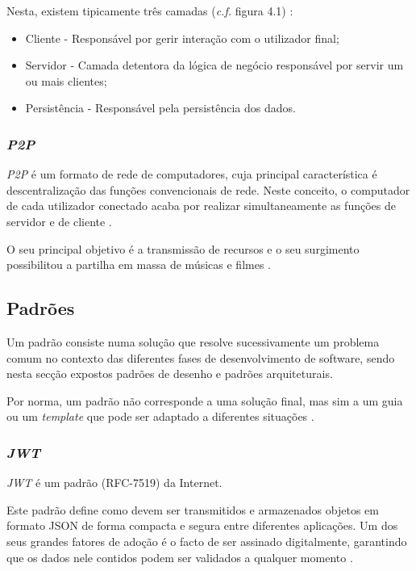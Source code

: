Nesta, existem tipicamente três camadas (\emph{c.f.} figura 4.1) \cite{designing_software_architectures}:

\begin{itemize}
    \item Cliente - Responsável por gerir interação com o utilizador final;
    \item Servidor - Camada detentora da lógica de negócio responsável por servir um ou mais clientes;
    \item Persistência - Responsável pela persistência dos dados.
\end{itemize}

\subsubsection{\emph{\acrshort{P2P}} \label{subsection:p2p}}
\emph{\acrshort{P2P}} é um formato de rede de computadores, cuja principal característica é descentralização das funções convencionais de rede. Neste conceito, o computador de cada utilizador conectado acaba por realizar simultaneamente as funções de servidor e de cliente \cite{what_are_P2P_networks}.

O seu principal objetivo é a transmissão de recursos e o seu surgimento possibilitou a partilha em massa de músicas e filmes \cite{what_are_P2P_networks}.

\subsection{Padrões}
Um padrão consiste numa solução que resolve sucessivamente um problema comum no contexto das diferentes fases de desenvolvimento de software, sendo nesta secção expostos padrões de desenho e padrões arquiteturais. 

Por norma, um padrão não corresponde a uma solução final, mas sim a um guia ou um \emph{template} que pode ser adaptado a diferentes situações \cite{clean_architecture}.

\subsubsection{\emph{\acrfull{JWT}}\label{subsection:jwt}}
\emph{\acrshort{JWT}} é um padrão (RFC-7519) da Internet.

Este padrão define como devem ser transmitidos e armazenados objetos em formato JSON de forma compacta e segura entre diferentes aplicações. Um dos seus grandes fatores de adoção é o facto de ser assinado digitalmente, garantindo que os dados nele contidos podem ser validados a qualquer momento \cite{jwt_medium}.

